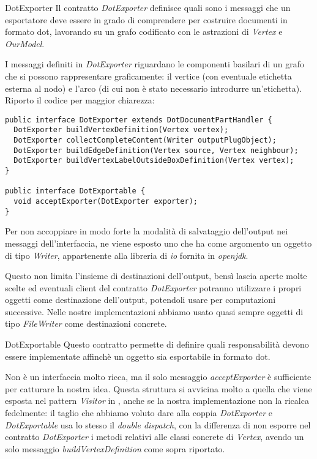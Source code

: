 \begin{paragraph}{DotExporter}
  Il contratto \emph{DotExporter} definisce quali sono i messaggi che
  un esportatore deve essere in grado di comprendere per costruire
  documenti in formato dot, lavorando su un grafo codificato con le
  astrazioni di \emph{Vertex} e \emph{OurModel}.

  I messaggi definiti in \emph{DotExporter} riguardano le componenti
  basilari di un grafo che si possono rappresentare graficamente: il
  vertice (con eventuale etichetta esterna al nodo) e l'arco (di cui
  non \`e stato necessario introdurre un'etichetta). Riporto il codice
  per maggior chiarezza:
  \begin{lstlisting}
public interface DotExporter extends DotDocumentPartHandler {
  DotExporter buildVertexDefinition(Vertex vertex);
  DotExporter collectCompleteContent(Writer outputPlugObject);
  DotExporter buildEdgeDefinition(Vertex source, Vertex neighbour);
  DotExporter buildVertexLabelOutsideBoxDefinition(Vertex vertex);
}

public interface DotExportable {
  void acceptExporter(DotExporter exporter);
}

  \end{lstlisting}
  Per non accoppiare in modo forte la modalit\`a di salvataggio
  dell'output nei messaggi dell'interfaccia, ne viene esposto uno che
  ha come argomento un oggetto di tipo \emph{Writer}, appartenente alla
  libreria di \emph{io} fornita in \emph{openjdk}.

  Questo non limita l'insieme di destinazioni dell'output, bens\`i
  lascia aperte molte scelte ed eventuali client del contratto
  \emph{DotExporter} potranno utilizzare i propri oggetti come
  destinazione dell'output, potendoli usare per computazioni
  successive. Nelle nostre implementazioni abbiamo usato quasi sempre
  oggetti di tipo \emph{FileWriter} come destinazioni concrete.
\end{paragraph}

\begin{paragraph}{DotExportable}
  Questo contratto permette di definire quali responsabilit\`a devono
  essere implementate affinch\`e un oggetto sia esportabile in formato
  dot.

  Non \`e un interfaccia molto ricca, ma il solo messaggio
  \emph{acceptExporter} \`e sufficiente per catturare la nostra
  idea. Questa struttura si avvicina molto a quella che viene esposta
  nel pattern \emph{Visitor} in \cite{SmalltalkCompanion98}, anche se
  la nostra implementazione non la ricalca fedelmente: il taglio che
  abbiamo voluto dare alla coppia \emph{DotExporter} e
  \emph{DotExportable} usa lo stesso il \emph{double dispatch}, con la
  differenza di non esporre nel contratto \emph{DotExporter} i metodi
  relativi alle classi concrete di \emph{Vertex}, avendo un solo
  messaggio \emph{buildVertexDefinition} come sopra riportato.
\end{paragraph}




